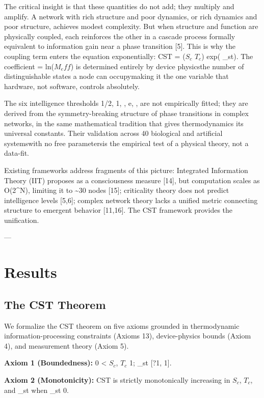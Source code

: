 \documentclass[a4paper,12pt]{article}
\begin{document}
The critical insight is that these quantities do not add; they multiply and amplify. A network with rich structure and poor dynamics, or rich dynamics and poor structure, achieves modest complexity. But when structure and function are physically coupled, each reinforces the other in a cascade process formally equivalent to information gain near a phase transition [5]. This is why the coupling term enters the equation exponentially: CST = ($S_c$  $T_c$)  exp(  _st). The coefficient  = ln($M_eff$) is determined entirely by device physicsthe number of distinguishable states a node can occupymaking it the one variable that hardware, not software, controls absolutely.


The six intelligence thresholds {1/2, 1, , e, , } are not empirically fitted; they are derived from the symmetry-breaking structure of phase transitions in complex networks, in the same mathematical tradition that gives thermodynamics its universal constants. Their validation across 40 biological and artificial systemswith no free parametersis the empirical test of a physical theory, not a data-fit.


Existing frameworks address fragments of this picture: Integrated Information Theory (IIT) proposes  as a consciousness measure [14], but computation scales as O(2^N), limiting it to \textasciitilde{}30 nodes [15]; criticality theory does not predict intelligence levels [5,6]; complex network theory lacks a unified metric connecting structure to emergent behavior [11,16]. The CST framework provides the unification.


---


\section{Results}

\subsection{The CST Theorem}

We formalize the CST theorem on five axioms grounded in thermodynamic information-processing constraints (Axioms 13), device-physics bounds (Axiom 4), and measurement theory (Axiom 5).


\textbf{Axiom 1 (Boundedness):} 0 < $S_c$, $T_c$  1; _st  [?1, 1].

\textbf{Axiom 2 (Monotonicity):} CST is strictly monotonically increasing in $S_c$, $T_c$, and _st when _st  0.
\end{document}
